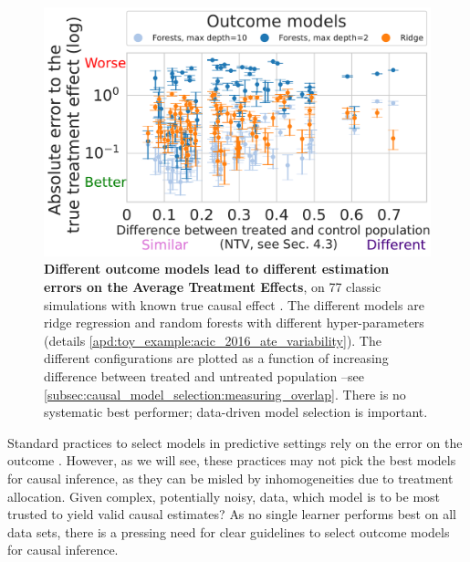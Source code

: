 \documentclass{report}
\begin{document}
\begin{figure}[h!]
  \begin{minipage}{.3\linewidth}
    \caption{\textbf{Different outcome models lead to different
        estimation errors on the Average Treatment Effects},
      on 77 classic simulations with known true causal effect
      \citep{dorie_automated_2019}. The different models are ridge regression
      and random forests with different hyper-parameters
      (details
      \ref{apd:toy_example:acic_2016_ate_variability}). The different configurations are
      plotted as a function of increasing difference between treated and
      untreated population --see
      \autoref{subsec:causal_model_selection:measuring_overlap}.
      There is no systematic best performer; data-driven model
      selection is important.
      \label{fig:acic_2016_ate_heterogeneity}
    }
  \end{minipage}
  \hfill
  \begin{minipage}{.65\linewidth}
    \includegraphics[width=\linewidth]{img/chapter_5/_2023-03-08-11-10-28_acic_2016_ate_heterogeneity.parquet_abs_bias_ylog_scale=True.pdf}%
  \end{minipage}
\end{figure}

Standard practices to select models in predictive settings rely on
the error on the outcome
\citep{poldrack2020establishment,varoquaux2022evaluating}. However, as we
will see, these practices may not pick the best models
for causal inference, as they can be misled by inhomogeneities due to
treatment allocation.
%
Given complex, potentially noisy, data, which model is to be most trusted to
yield valid causal estimates? As no single learner performs
best on all data sets, there is a pressing need for clear guidelines to select
outcome models for causal inference.
\end{document}
